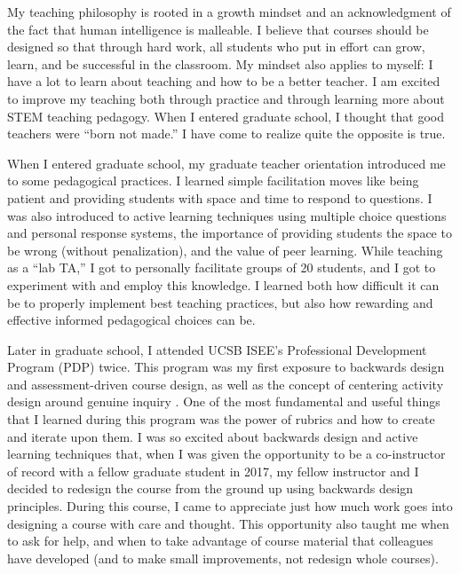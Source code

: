 \documentclass[11pt]{article}
\begin{document}
\thispagestyle{fancy}

My teaching philosophy is rooted in a growth mindset \citep{moser_etal_2011} and an acknowledgment of the fact that human intelligence is malleable. 
I believe that courses should be designed so that through hard work, all students who put in effort can grow, learn, and be successful in the classroom.
My mindset also applies to myself: I have a lot to learn about teaching and how to be a better teacher.
I am excited to improve my teaching both through practice and through learning more about STEM teaching pedagogy.
When I entered graduate school, I thought that good teachers were “born not made.” 
I have come to realize quite the opposite is true. 

When I entered graduate school, my graduate teacher orientation introduced me to some pedagogical practices. 
I learned simple facilitation moves like being patient and providing students with space and time to respond to questions. 
I was also introduced to active learning techniques using multiple choice questions and personal response systems, the importance of providing students the space to be wrong (without penalization), and the value of peer learning.
While teaching as a “lab TA,” I got to personally facilitate groups of 20 students, and I got to experiment with and employ this knowledge.
I learned both how difficult it can be to properly implement best teaching practices, but also how rewarding and effective informed pedagogical choices can be.

Later in graduate school, I attended UCSB ISEE’s Professional Development Program (PDP) twice. 
This program was my first exposure to backwards design \citep{wiggins_mctighe_2005} and assessment-driven course design, as well as the concept of centering activity design around genuine inquiry \citep{inquiry}. 
One of the most fundamental and useful things that I learned during this program was the power of rubrics and how to create and iterate upon them. 
I was so excited about backwards design and active learning techniques that, when I was given the opportunity to be a co-instructor of record with a fellow graduate student in 2017, my fellow instructor and I decided to redesign the course from the ground up using backwards design principles. 
During this course, I came to appreciate just how much work goes into designing a course with care and thought. 
This opportunity also taught me when to ask for help, and when to take advantage of course material that colleagues have developed (and to make small improvements, not redesign whole courses).
\end{document}
